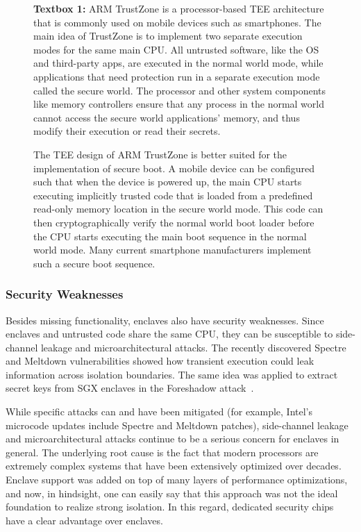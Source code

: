 \begin{figure}
    \begin{tcolorbox}
    \textbf{Textbox 1:} 
    ARM TrustZone is a processor-based TEE architecture that is commonly used on mobile devices such as smartphones. The main idea of TrustZone is to implement two separate execution modes for the same main CPU. All untrusted software, like the OS and third-party apps, are executed in the normal world mode, while applications that need protection run in a separate execution mode called the secure world. The processor and other system components like memory controllers ensure that any process in the normal world cannot access the secure world applications' memory, and thus modify their execution or read their secrets.
    
    The TEE design of ARM TrustZone is better suited for the implementation of secure boot. A mobile device can be configured such that when the device is powered up, the main CPU starts executing implicitly trusted code that is loaded from a predefined read-only memory location in the secure world mode. This code can then cryptographically verify the normal world boot loader before the CPU starts executing the main boot sequence in the normal world mode. Many current smartphone manufacturers implement such a secure boot sequence.
    \end{tcolorbox}
\end{figure}  


\subsubsection*{Security Weaknesses}

Besides missing functionality, enclaves also have security weaknesses. Since enclaves and untrusted code share the same CPU, they can be susceptible to side-channel leakage and microarchitectural attacks. The recently discovered Spectre and Meltdown vulnerabilities showed how transient execution could leak information across isolation boundaries. The same idea was applied to extract secret keys from SGX enclaves in the Foreshadow attack~\cite{van2018foreshadow}. 

While specific attacks can and have been mitigated (for example, Intel's microcode updates include Spectre and Meltdown patches), side-channel leakage and microarchitectural attacks continue to be a serious concern for enclaves in general. The underlying root cause is the fact that modern processors are extremely complex systems that have been extensively optimized over decades. Enclave support was added on top of many layers of performance optimizations, and now, in hindsight, one can easily say that this approach was not the ideal foundation to realize strong isolation. In this regard, dedicated security chips have a clear advantage over enclaves.


